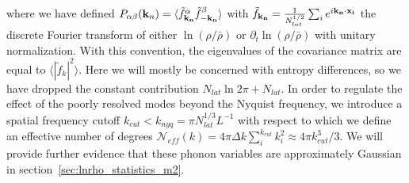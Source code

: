 \documentclass[11pt,a4paper]{article}
\def\lnr{\ln(\rho/\bar{\rho})}
\def\dlnr{\partial_t\ln(\rho/\bar{\rho})}
\begin{document}
where we have defined $P_{\alpha\beta}({\bf k}_n) = \langle \tilde{f}_{\bf k_n}^\alpha \tilde{f}_{\bf -k_n}^\beta\rangle$ with $\tilde{f}_{\bf k_n} = \frac{1}{N_{lat}^{1/2}}\sum_ie^{i{\bf k_n}\cdot{\bf x_i}}$ the discrete Fourier transform of either $\lnr$ or $\dlnr$ with unitary normalization.
With this convention, the eigenvalues of the covariance matrix are equal to $\langle |\tilde{f}_k|^2\rangle$.
Here we will mostly be concerned with entropy differences, so we have dropped the constant contribution $N_{lat}\ln 2\pi + N_{lat}$.
In order to regulate the effect of the poorly resolved modes beyond the Nyquist frequency, we introduce a spatial frequency cutoff $k_{cut} < k_{nyq} = \pi N_{lat}^{1/3} L^{-1}$ with respect to which we define an effective number of degrees $\mathcal{N}_{eff}(k) = 4\pi\Delta k\sum_i^{k_{cut}} k_i^2 \approx 4\pi k_{cut}^3/3$.
We will provide further evidence that these phonon variables are approximately Gaussian in section~\ref{sec:lnrho_statistics_m2}.
\end{document}
